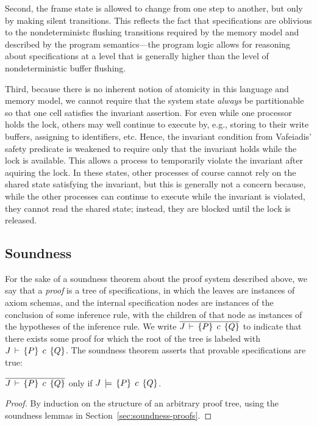 \documentclass[11pt]{report}
\begin{document}
Second, the frame state is allowed to change from one step to another, but only by making silent transitions. This reflects the fact that specifications are oblivious to the nondeterministc flushing transitions required by the memory model and described by the program semantics---the program logic allows for reasoning about specifications at a level that is generally higher than the level of nondeterministic buffer flushing. 

Third, because there is no inherent notion of atomicity in this language and memory model, we cannot require that the system state \emph{always} be partitionable so that one cell satisfies the invariant assertion. For even while one processor holds the lock, others may well continue to execute by, e.g., storing to their write buffers, assigning to identifiers, etc. Hence, the invariant condition from Vafeiadis' safety predicate is weakened to require only that the invariant holds while the lock is available. This allows a process to  temporarily violate the invariant after aquiring the lock. In these states, other processes of course cannot rely on the shared state satisfying the invariant, but this is generally not a concern because, while the other processes can continue to execute while the invariant is violated, they cannot read the shared state; instead, they are blocked until the lock is released. 


\subsection{Soundness}

For the sake of a soundness theorem about the proof system described above, we say that a \emph{proof} is a tree of specifications, in which the leaves are instances of axiom schemas, and the internal specification nodes are instances of the conclusion of some inference rule, with the children of that node as instances of the hypotheses of the inference rule. We write $\overline{J\,\vdash\,\left\lbrace P \right\rbrace\;c\;\left\lbrace Q \right\rbrace}$ to indicate that there exists some proof for which the root of the tree is labeled with $J\,\vdash\,\left\lbrace P \right\rbrace\;c\;\left\lbrace Q \right\rbrace$. The soundness theorem asserts that provable specifications are true: 

\begin{theorem}[Soundness]
  \label{thm:soundness}
	$\overline{J\,\vdash\,\left\lbrace P \right\rbrace\;c\;\left\lbrace Q \right\rbrace}$ only if $J\,\models\,\left\lbrace P \right\rbrace\;c\;\left\lbrace Q \right\rbrace$. 
\end{theorem}

\begin{proof}
	By induction on the structure of an arbitrary proof tree, using the soundness lemmas in Section~\ref{sec:soundness-proofs}. 
\end{proof}
\end{document}
